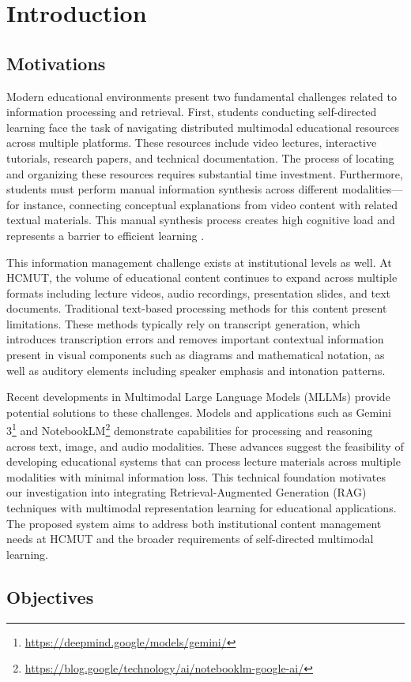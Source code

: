 \chapter{Introduction}

\section{Motivations}

Modern educational environments present two fundamental challenges related to information processing and retrieval. First, students conducting self-directed learning face the task of navigating distributed multimodal educational resources across multiple platforms. These resources include video lectures, interactive tutorials, research papers, and technical documentation. The process of locating and organizing these resources requires substantial time investment. Furthermore, students must perform manual information synthesis across different modalities—for instance, connecting conceptual explanations from video content with related textual materials. This manual synthesis process creates high cognitive load and represents a barrier to efficient learning \cite{bib01, bib02}.

This information management challenge exists at institutional levels as well. At HCMUT, the volume of educational content continues to expand across multiple formats including lecture videos, audio recordings, presentation slides, and text documents. Traditional text-based processing methods for this content present limitations. These methods typically rely on transcript generation, which introduces transcription errors and removes important contextual information present in visual components such as diagrams and mathematical notation, as well as auditory elements including speaker emphasis and intonation patterns.

Recent developments in Multimodal Large Language Models (MLLMs) provide potential solutions to these challenges. Models and applications such as Gemini 3\footnote{\url{https://deepmind.google/models/gemini/}} and NotebookLM\footnote{\url{https://blog.google/technology/ai/notebooklm-google-ai/}} demonstrate capabilities for processing and reasoning across text, image, and audio modalities. These advances suggest the feasibility of developing educational systems that can process lecture materials across multiple modalities with minimal information loss. This technical foundation motivates our investigation into integrating Retrieval-Augmented Generation (RAG) techniques with multimodal representation learning for educational applications. The proposed system aims to address both institutional content management needs at HCMUT and the broader requirements of self-directed multimodal learning.\section{Objectives}

